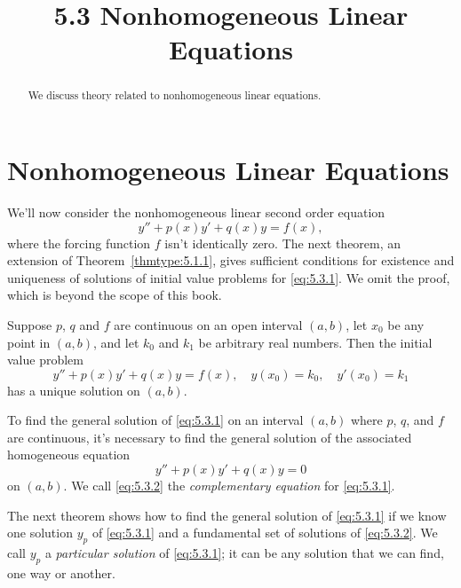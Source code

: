 \documentclass{ximera}
\title{5.3 Nonhomogeneous Linear Equations}
\begin{document}
 
\begin{abstract}
 We discuss theory related to nonhomogeneous linear equations.
\end{abstract}
 
\maketitle
 
\section*{Nonhomogeneous Linear Equations}
 
We'll now consider the nonhomogeneous linear second order equation
\begin{equation} \label{eq:5.3.1}
y''+p(x)y'+q(x)y=f(x),
\end{equation}
where the forcing function $f$ isn't  identically zero. The next
theorem, an extension of Theorem~\ref{thmtype:5.1.1}, gives sufficient
conditions for existence and uniqueness of solutions of initial value
problems for \eqref{eq:5.3.1}. We omit the proof, which is beyond the
scope of this book.
 
\begin{theorem}\label{thmtype:5.3.1}
Suppose $p$, $q$ and $f$ are continuous on an open interval
$(a,b)$, let $x_0$ be any point in $(a,b)$, and let $k_0$ and $k_1$ be
arbitrary real numbers. Then the initial value problem
$$
y''+p(x)y'+q(x)y=f(x), \quad  y(x_0)=k_0,\quad y'(x_0)=k_1
$$
 has a unique solution  on $(a,b)$.
\end{theorem}
 
To find the general solution of  \eqref{eq:5.3.1}
on an interval $(a,b)$ where $p$, $q$, and $f$ are continuous,
it's necessary to find the general solution  of
 the associated homogeneous equation
\begin{equation} \label{eq:5.3.2}
y''+p(x)y'+q(x)y=0
\end{equation}
on $(a,b)$. We call \eqref{eq:5.3.2} the \textit{complementary equation}
for \eqref{eq:5.3.1}.
 
The next theorem shows how to find the general solution of
\eqref{eq:5.3.1} if we know one solution $y_p$ of \eqref{eq:5.3.1} and a
fundamental set of solutions of \eqref{eq:5.3.2}. We call
$y_p$ a \textit{particular solution} of \eqref{eq:5.3.1};   it
can be any solution that we can find,  one way or another.
 
\end{document}
